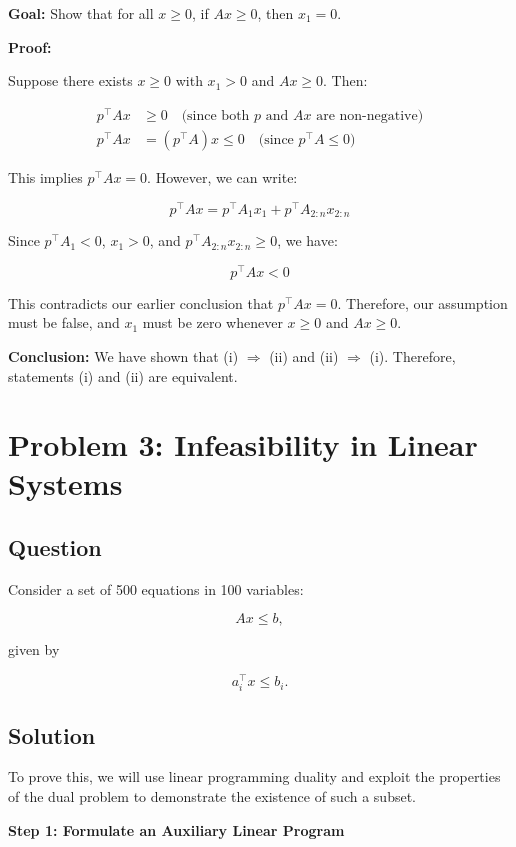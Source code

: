 \documentclass[12pt,letterpaper]{article}
\begin{document}
\textbf{Goal:} Show that for all $x \geq 0$, if $Ax \geq 0$, then $x_1 = 0$.

\textbf{Proof:}

Suppose there exists $x \geq 0$ with $x_1 > 0$ and $Ax \geq 0$. Then:

\begin{align*}
    p^\top A x &\geq 0 \quad \text{(since both $p$ and $Ax$ are non-negative)} \\
    p^\top A x &= (p^\top A) x \leq 0 \quad \text{(since $p^\top A \leq 0$)}
\end{align*}

This implies $p^\top A x = 0$. However, we can write:

\[p^\top A x = p^\top A_1 x_1 + p^\top A_{2:n} x_{2:n}\]

Since $p^\top A_1 < 0$, $x_1 > 0$, and $p^\top A_{2:n} x_{2:n} \geq 0$, we have:

\[p^\top A x < 0\]

This contradicts our earlier conclusion that $p^\top A x = 0$. Therefore, our assumption must be false, and $x_1$ must be zero whenever $x \geq 0$ and $Ax \geq 0$.

\textbf{Conclusion:} We have shown that (i) $\Rightarrow$ (ii) and (ii) $\Rightarrow$ (i). Therefore, statements (i) and (ii) are equivalent.


\newpage
\section{Problem 3: Infeasibility in Linear Systems}

\subsection{Question}
Consider a set of 500 equations in 100 variables:

\[Ax \leq b,\]

given by

\[a_i^\top x \leq b_i.\]

\subsection{Solution}

To prove this, we will use linear programming duality and exploit the properties of the dual problem to demonstrate the existence of such a subset.

\textbf{Step 1: Formulate an Auxiliary Linear Program}
\end{document}
